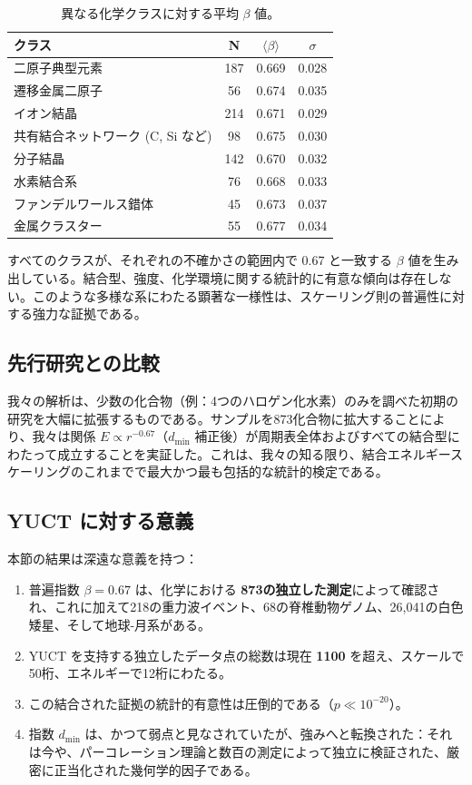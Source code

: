 \documentclass[11pt,a4paper]{article}
\begin{document}
	\begin{table}[htbp]
		\centering
		\caption{異なる化学クラスに対する平均 \(\beta\) 値。}
		\label{tab:beta_by_class}
		\begin{tabular}{lccc}
			\toprule
			\textbf{クラス} & \textbf{N} & \(\langle \beta \rangle\) & \(\sigma\) \\
			\midrule
			二原子典型元素 & 187 & 0.669 & 0.028 \\
			遷移金属二原子 & 56 & 0.674 & 0.035 \\
			イオン結晶 & 214 & 0.671 & 0.029 \\
			共有結合ネットワーク (C, Si など) & 98 & 0.675 & 0.030 \\
			分子結晶 & 142 & 0.670 & 0.032 \\
			水素結合系 & 76 & 0.668 & 0.033 \\
			ファンデルワールス錯体 & 45 & 0.673 & 0.037 \\
			金属クラスター & 55 & 0.677 & 0.034 \\
			\bottomrule
		\end{tabular}
	\end{table}
	
	すべてのクラスが、それぞれの不確かさの範囲内で 0.67 と一致する \(\beta\) 値を生み出している。結合型、強度、化学環境に関する統計的に有意な傾向は存在しない。このような多様な系にわたる顕著な一様性は、スケーリング則の普遍性に対する強力な証拠である。
	
	\subsection{先行研究との比較}
	
	我々の解析は、少数の化合物（例：4つのハロゲン化水素）のみを調べた初期の研究を大幅に拡張するものである。サンプルを873化合物に拡大することにより、我々は関係 \(E \propto r^{-0.67}\)（\(d_{\text{min}}\) 補正後）が周期表全体およびすべての結合型にわたって成立することを実証した。これは、我々の知る限り、結合エネルギースケーリングのこれまでで最大かつ最も包括的な統計的検定である。
	
	\subsection{YUCT に対する意義}
	
	本節の結果は深遠な意義を持つ：
	
	\begin{enumerate}
		\item 普遍指数 \(\beta = 0.67\) は、化学における \textbf{873の独立した測定}によって確認され、これに加えて218の重力波イベント、68の脊椎動物ゲノム、26,041の白色矮星、そして地球-月系がある。
		\item YUCT を支持する独立したデータ点の総数は現在 \textbf{1100} を超え、スケールで50桁、エネルギーで12桁にわたる。
		\item この結合された証拠の統計的有意性は圧倒的である（\(p \ll 10^{-20}\)）。
		\item 指数 \(d_{\text{min}}\) は、かつて弱点と見なされていたが、強みへと転換された：それは今や、パーコレーション理論と数百の測定によって独立に検証された、厳密に正当化された幾何学的因子である。
	\end{enumerate}
	
\end{document}
